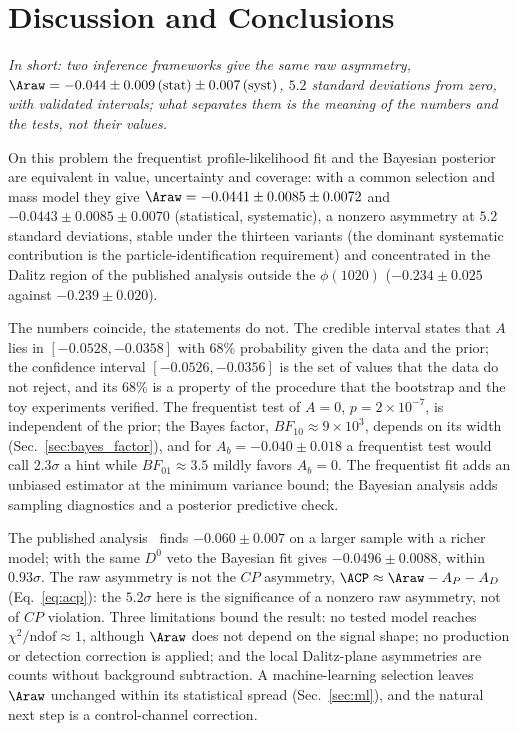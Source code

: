 \section{Discussion and Conclusions}
\label{sec:conclusions}
\label{sec:comparison}
\emph{In short: two inference frameworks give the same raw asymmetry, $\Araw=-0.044\pm0.009\,(\text{stat})\pm0.007\,(\text{syst})$, $5.2$ standard deviations from zero, with validated intervals; what separates them is the meaning of the numbers and the tests, not their values.}

On this problem the frequentist profile-likelihood fit and the Bayesian posterior are equivalent in value, uncertainty and coverage: with a common selection and mass model they give $\Araw=-0.0441\pm0.0085\pm0.0072$ and $-0.0443\pm0.0085\pm0.0070$ (statistical, systematic), a nonzero asymmetry at $5.2$ standard deviations, stable under the thirteen variants (the dominant systematic contribution is the particle-identification requirement) and concentrated in the Dalitz region of the published analysis outside the $\phi(1020)$ ($-0.234\pm0.025$ against $-0.239\pm0.020$).

The numbers coincide, the statements do not. The credible interval states that $A$ lies in $[-0.0528,-0.0358]$ with $68\%$ probability given the data and the prior; the confidence interval $[-0.0526,-0.0356]$ is the set of values that the data do not reject, and its $68\%$ is a property of the procedure that the bootstrap and the toy experiments verified. The frequentist test of $A=0$, $p=2\times10^{-7}$, is independent of the prior; the Bayes factor, $BF_{10}\approx9\times10^3$, depends on its width (Sec.~\ref{sec:bayes_factor}), and for $A_b=-0.040\pm0.018$ a frequentist test would call $2.3\sigma$ a hint while $BF_{01}\approx3.5$ mildly favors $A_b=0$. The frequentist fit adds an unbiased estimator at the minimum variance bound; the Bayesian analysis adds sampling diagnostics and a posterior predictive check.

\label{sec:comparison_published}
The published analysis~\cite{lhcb_cpv_2013} finds $-0.060\pm0.007$ on a larger sample with a richer model; with the same $D^0$ veto the Bayesian fit gives $-0.0496\pm0.0088$, within $0.93\sigma$. The raw asymmetry is not the $CP$ asymmetry, $\ACP\approx\Araw-A_P-A_D$ (Eq.~\eqref{eq:acp}): the $5.2\sigma$ here is the significance of a nonzero raw asymmetry, not of $CP$ violation. Three limitations bound the result: no tested model reaches $\chi^2/\mathrm{ndof}\approx1$, although $\Araw$ does not depend on the signal shape; no production or detection correction is applied; and the local Dalitz-plane asymmetries are counts without background subtraction. A machine-learning selection leaves $\Araw$ unchanged within its statistical spread (Sec.~\ref{sec:ml}), and the natural next step is a control-channel correction.
